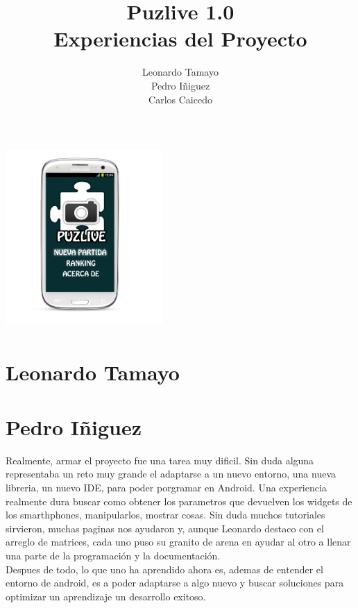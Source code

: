 \documentclass[10pt]{article}
\title{\bfseries\Huge Puzlive 1.0\\ Experiencias del Proyecto}
\author{Leonardo Tamayo \\Pedro Iñiguez \\Carlos Caicedo}
\date{}
\begin{document}
\begin{minipage}{0.65\textwidth}
\begingroup
\let\center\flushleft
\let\endcenter\endflushleft
\maketitle

\endgroup
\end{minipage}
\begin{minipage}{0.3\textwidth}

\includegraphics[height=7cm,width=6cm]{androidpro4.png}
\end{minipage}

\section{Leonardo Tamayo}


	
\section{Pedro Iñiguez}
Realmente, armar el proyecto fue una tarea muy dificil. Sin duda alguna representaba un reto muy grande el adaptarse a un nuevo entorno, una nueva libreria, un nuevo IDE, para
poder porgramar en Android. Una experiencia realmente dura buscar como obtener los parametros que devuelven los widgets de los smarthphones, manipularlos, mostrar cosas.
Sin duda muchos tutoriales sirvieron, muchas paginas nos ayudaron y, aunque Leonardo destaco con el arreglo de matrices, cada uno puso su granito de arena en ayudar al otro 
a llenar una parte de la programaci\'on y la documentaci\'on. \\Despues de todo, lo que uno ha aprendido ahora es, ademas de entender el entorno de android, es a poder adaptarse
a algo nuevo y buscar soluciones para optimizar un aprendizaje un desarrollo exitoso.
	
\end{document}

